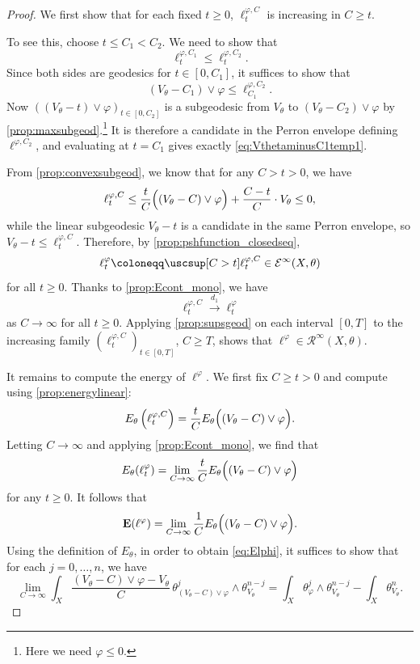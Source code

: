 \begin{proof}
    We first show that for each fixed $t\geq 0$, $\ell_t^{\varphi,C}$ is increasing in $C\geq t$.

    To see this, choose $t\leq C_1<C_2$. We need to show that
    \[
    \ell^{\varphi,C_1}_t\leq \ell^{\varphi,C_2}_t.
    \]
    Since both sides are geodesics for $t\in [0,C_1]$, it suffices to show that
    \begin{equation}\label{eq:VthetaminusC1temp1}
    (V_{\theta}-C_1)\lor \varphi \leq \ell_{C_1}^{\varphi,C_2}.
    \end{equation}
    Now $((V_{\theta}-t)\lor \varphi)_{t\in [0,C_2]}$ is a subgeodesic from $V_{\theta}$ to $(V_{\theta}-C_2)\lor \varphi$ by \cref{prop:maxsubgeod}.\footnote{Here we need $\varphi\leq 0$.} It is therefore a candidate in the Perron envelope defining $\ell^{\varphi,C_2}$, and evaluating at $t=C_1$ gives exactly \eqref{eq:VthetaminusC1temp1}.

    From \cref{prop:convexsubgeod}, we know that for any $C>t>0$, we have
    \[
    \ell^{\varphi,C}_t\leq \frac{t}{C}\Bigl((V_{\theta}-C)\lor \varphi\Bigr)+\frac{C-t}{C}\cdot V_{\theta}\leq 0,
    \]
    while the linear subgeodesic $V_\theta-t$ is a candidate in the same Perron envelope, so $V_\theta-t\leq \ell^{\varphi,C}_t$. Therefore, by \cref{prop:pshfunction_closedseq},
    \begin{equation}\label{eq:ellphitexp}
    \ell_t^{\varphi}\coloneqq \uscsup[C>t]\ell^{\varphi,C}_t\in \mathcal{E}^{\infty}(X,\theta)
    \end{equation}
    for all $t\geq 0$. Thanks to \cref{prop:Econt_mono}, we have
    \[
    \ell^{\varphi,C}_t\xrightarrow{d_1} \ell_t^{\varphi}
    \]
    as $C\to\infty$ for all $t\geq 0$. Applying \cref{prop:supsgeod} on each interval $[0,T]$ to the increasing family $(\ell^{\varphi,C}_t)_{t\in [0,T]}$, $C\geq T$, shows that $\ell^{\varphi}\in \mathcal{R}^{\infty}(X,\theta)$.

    It remains to compute the energy of $\ell^{\varphi}$. We first fix $C\geq t>0$ and compute using \cref{prop:energylinear}:
    \[
        E_{\theta}\left(\ell^{\varphi,C}_t\right)=\frac{t}{C}E_{\theta}\Bigl((V_{\theta}-C)\lor \varphi\Bigr).
    \]
    Letting $C\to\infty$ and applying \cref{prop:Econt_mono}, we find that
    \[
        E_{\theta}(\ell^{\varphi}_t)=\lim_{C\to\infty}\frac{t}{C}E_{\theta}\Bigl((V_{\theta}-C)\lor \varphi\Bigr)
    \]
    for any $t\geq 0$.
    It follows that
    \[
        \mathbf{E}(\ell^{\varphi})=\lim_{C\to\infty}\frac{1}{C}E_{\theta}\Bigl((V_{\theta}-C)\lor \varphi\Bigr).
    \]
    Using the definition of $E_{\theta}$, in order to obtain \eqref{eq:Elphi}, it suffices to show that for each $j=0,\ldots,n$, we have
    \begin{equation}\label{eq:limCintXtemp1}
    \lim_{C\to\infty}\int_X \frac{(V_{\theta}-C)\lor\varphi -V_{\theta}}{C} \,\theta_{(V_{\theta}-C)\lor \varphi}^j\wedge \theta_{V_{\theta}}^{n-j}=\int_X \theta_{\varphi}^{j}\wedge \theta_{V_{\theta}}^{n-j}-\int_X \theta_{V_{\theta}}^n.
    \end{equation}


\end{proof}
